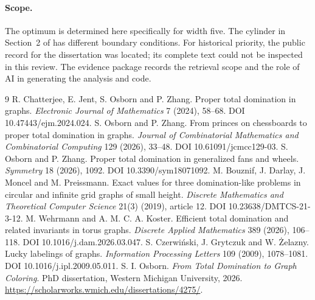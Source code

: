 \documentclass[11pt,a4paper]{article}
\begin{document}
\paragraph{Scope.} The optimum is determined here specifically for width five. The cylinder in Section~2 of \cite{princes} has different boundary conditions. For historical priority, the public record for the dissertation \cite{thesis} was located; its complete text could not be inspected in this review. The evidence package records the retrieval scope and the role of AI in generating the analysis and code.

\begin{thebibliography}{9}\small
{} R. Chatterjee, E. Jent, S. Osborn and P. Zhang. Proper total domination in graphs. \emph{Electronic Journal of Mathematics} 7 (2024), 58--68. DOI 10.47443/ejm.2024.024.
 S. Osborn and P. Zhang. From princes on chessboards to proper total domination in graphs. \emph{Journal of Combinatorial Mathematics and Combinatorial Computing} 129 (2026), 33--48. DOI 10.61091/jcmcc129-03.
 S. Osborn and P. Zhang. Proper total domination in generalized fans and wheels. \emph{Symmetry} 18 (2026), 1092. DOI 10.3390/sym18071092.
 M. Bouznif, J. Darlay, J. Moncel and M. Preissmann. Exact values for three domination-like problems in circular and infinite grid graphs of small height. \emph{Discrete Mathematics and Theoretical Computer Science} 21(3) (2019), article 12. DOI 10.23638/DMTCS-21-3-12.
 M. Wehrmann and A. M. C. A. Koster. Efficient total domination and related invariants in torus graphs. \emph{Discrete Applied Mathematics} 389 (2026), 106--118. DOI 10.1016/j.dam.2026.03.047.
 S. Czerwi\'nski, J. Grytczuk and W. \.Zelazny. Lucky labelings of graphs. \emph{Information Processing Letters} 109 (2009), 1078--1081. DOI 10.1016/j.ipl.2009.05.011.
 S. I. Osborn. \emph{From Total Domination to Graph Coloring}. PhD dissertation, Western Michigan University, 2026. \url{https://scholarworks.wmich.edu/dissertations/4275/}.
\end{thebibliography}
\end{document}
